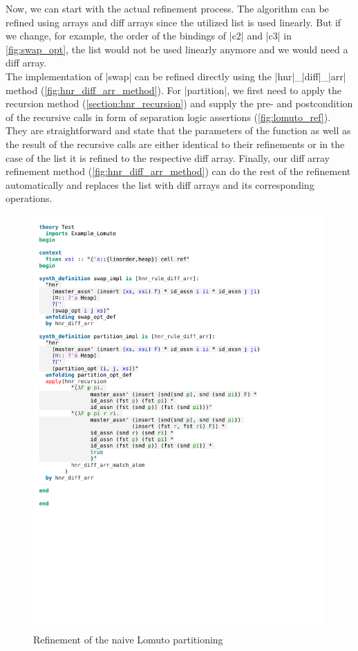 \noindent Now, we can start with the actual refinement process. The algorithm can be refined using arrays and diff arrays since the utilized list is used linearly. But if we change, for example, the order of the bindings of |c2| and |c3| in \autoref{fig:swap_opt}, the list would not be used linearly anymore and we would need a diff array.\\
The implementation of |swap| can be refined directly using the |hnr|\_|diff|\_|arr| method (\autoref{fig:hnr_diff_arr_method}). For |partition|, we first need to apply the recursion method (\autoref{section:hnr_recursion}) and supply the pre- and postcondition of the recursive calls in form of separation logic assertions (\autoref{fig:lomuto_ref}). They are straightforward and state that the parameters of the function as well as the result of the recursive calls are either identical to their refinements or in the case of the list it is refined to the respective diff array. Finally, our diff array refinement method (\autoref{fig:hnr_diff_arr_method}) can do the rest of the refinement automatically and replaces the list with diff arrays and its corresponding operations.

\begin{figure}[htbp]
    \includegraphics[trim={0 10,6cm 0 4,2cm}, clip, width=1.00\textwidth]{figures/Theory_Example_Lomuto_Translation2.pdf}
    \caption[Refinement of the naive Lomuto partitioning]{Refinement of the naive Lomuto partitioning}
    \label{fig:lomuto_ref}
\end{figure}
